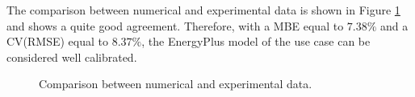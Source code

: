 The comparison between numerical and experimental data is shown in Figure \ref{F:houseComparisonExperimental} and shows a quite good agreement. Therefore, with a MBE equal to $7.38\%$ and a CV(RMSE) equal to $8.37\%$, the EnergyPlus model of the use case can be considered well calibrated.  
\begin{figure}[t!]
	\begin{center}
	\end{center}
	\caption{Comparison between numerical and experimental data.}
	\captionsetup{justification=centering}
	\label{F:houseComparisonExperimental}
\end{figure}
